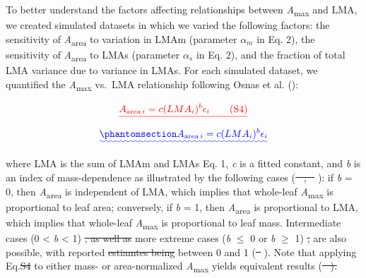 \documentclass[
  12pt,
  letterpaper,
  DIV=11,
  numbers=noendperiod]{scrartcl}
\numberwithin{equation}{section} %
\providecommand{\DIFadd}[1]{{\protect\color{blue}\uwave{#1}}} %
\providecommand{\DIFdel}[1]{{\protect\color{red}\sout{#1}}}                      %
\providecommand{\DIFaddbegin}{} %
\providecommand{\DIFaddend}{} %
\providecommand{\DIFdelbegin}{} %
\providecommand{\DIFdelend}{} %
\newcommand{\DIFscaledelfig}{0.5}
\newlength{\DIFdelgraphicswidth} %
\newlength{\DIFdelgraphicsheight} %
\newcommand{\DIFaddincludegraphics}[2][]{{\color{blue}\fbox{\DIFOincludegraphics[#1]{#2}}}} %
\newcommand{\DIFdelincludegraphics}[2][]{%
\sbox{\DIFdelgraphicsbox}{\DIFOincludegraphics[#1]{#2}}%
\settoboxwidth{\DIFdelgraphicswidth}{\DIFdelgraphicsbox} %
\settoboxtotalheight{\DIFdelgraphicsheight}{\DIFdelgraphicsbox} %
\scalebox{\DIFscaledelfig}{%
\parbox[b]{\DIFdelgraphicswidth}{\usebox{\DIFdelgraphicsbox}\\[-\baselineskip] \rule{\DIFdelgraphicswidth}{0em}}\llap{\resizebox{\DIFdelgraphicswidth}{\DIFdelgraphicsheight}{%
\setlength{\unitlength}{\DIFdelgraphicswidth}%
\begin{picture}(1,1)%
\thicklines\linethickness{2pt} %
{\color[rgb]{1,0,0}\put(0,0){\framebox(1,1){}}}%
{\color[rgb]{1,0,0}\put(0,0){\line( 1,1){1}}}%
{\color[rgb]{1,0,0}\put(0,1){\line(1,-1){1}}}%
\end{picture}%
}\hspace*{3pt}}} %
} %
\DeclareRobustCommand{\DIFaddbegin}{\DIFOaddbegin \let\includegraphics\DIFaddincludegraphics} %
\DeclareRobustCommand{\DIFaddend}{\DIFOaddend \let\includegraphics\DIFOincludegraphics} %
\DeclareRobustCommand{\DIFdelbegin}{\DIFOdelbegin \let\includegraphics\DIFdelincludegraphics} %
\DeclareRobustCommand{\DIFdelend}{\DIFOaddend \let\includegraphics\DIFOincludegraphics} %
\begin{document}
To better understand the factors affecting relationships between
\emph{A}\textsubscript{max} and LMA, we created simulated datasets in
which we varied the following factors: \DIFaddbegin \DIFadd{(1) }\DIFaddend the sensitivity of
\emph{A}\textsubscript{area} to variation in LMAm (parameter
\(\alpha_m\) in Eq. 2), \DIFaddbegin \DIFadd{(2) }\DIFaddend the sensitivity of
\emph{A}\textsubscript{area} to LMAs (parameter \(\alpha_s\) in Eq. 2),
and \DIFaddbegin \DIFadd{(3) }\DIFaddend the fraction of total LMA variance due to variance in LMAs. For
each simulated dataset, we quantified the \emph{A}\textsubscript{max}
vs.~LMA relationship following Osnas et al.
():

\DIFdelbegin \[
\DIFdel{A_{\mathrm{area} \, i} = c (LMA_i)^{b}\epsilon_i \qquad(\mathrm{S}4)
}\]%
\DIFdelend \DIFaddbegin \begin{equation}\DIFadd{\phantomsection\label{eq-mass}{
A_{\mathrm{area} \, i} = c (LMA_i)^{b}\epsilon_i
}}\end{equation}\DIFaddend 

where LMA is the sum of LMAm and LMAs \DIFaddbegin \DIFadd{(}\DIFaddend Eq. 1\DIFaddbegin \DIFadd{)}\DIFaddend , \emph{c} is a fitted
constant, and \emph{b} is an index of mass-dependence as illustrated by
the following cases (\DIFdelbegin \DIFdel{\mbox{%
\citeproc{ref-Osnas2018}{Osnas et al., 2018}}\hspace{0pt}%
,
\mbox{%
\citeproc{ref-Osnas2013}{2013}}\hspace{0pt}%
}\DIFdelend \DIFaddbegin \DIFadd{\mbox{%
\citeproc{ref-Osnas2013}{Osnas et al. 2013}}\hspace{0pt}%
,
\mbox{%
\citeproc{ref-Osnas2018}{2018}}\hspace{0pt}%
}\DIFaddend ): if \emph{b} = 0, then
\emph{A}\textsubscript{area} is independent of LMA, which implies that
whole-leaf \emph{A}\textsubscript{max} is proportional to leaf area;
conversely, if \emph{b} = 1, then \emph{A}\textsubscript{area} is
proportional to LMA, which implies that whole-leaf
\emph{A}\textsubscript{max} is proportional to leaf mass. Intermediate
cases (0 \textless{} \emph{b} \textless{} 1) \DIFdelbegin \DIFdel{, as well as }\DIFdelend \DIFaddbegin \DIFadd{and }\DIFaddend more extreme cases
(\emph{b} \(\le\) 0 or \emph{b} \(\geq\) 1) \DIFdelbegin \DIFdel{, }\DIFdelend are also possible, with
reported \DIFdelbegin \DIFdel{estiamtes being }\DIFdelend \DIFaddbegin \DIFadd{estimates ranging }\DIFaddend between 0 and 1
(\DIFdelbegin \DIFdel{\mbox{%
\citeproc{ref-Osnas2018}{Osnas et al., 2018}}\hspace{0pt}%
}\DIFdelend \DIFaddbegin \DIFadd{\mbox{%
\citeproc{ref-Osnas2018}{Osnas et al. 2018}}\hspace{0pt}%
}\DIFaddend ). Note that applying
Eq.\DIFdelbegin \DIFdel{S4 }\DIFdelend \DIFaddbegin \DIFadd{~\ref{eq-mass} }\DIFaddend to either mass- or area-normalized
\emph{A}\textsubscript{max} yields equivalent results
(\DIFdelbegin \DIFdel{\mbox{%
\citeproc{ref-Osnas2018}{Osnas et al., 2018}}\hspace{0pt}%
).
}%
\end{document}
